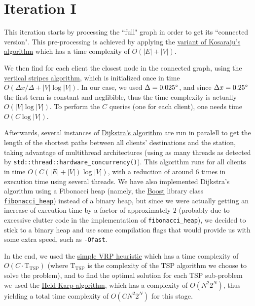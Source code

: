 \section{Iteration I} \label{iterations-1}
This iteration starts by processing the ``full" graph in order to get its ``connected version". This pre-processing is achieved by applying the \hyperref[algorithm-scc-kosaraju-v]{variant of Kosaraju's algorithm} which has a time complexity of $O(|E| + |V|)$.\par
We then find for each client the closest node in the connected graph, using the \hyperref[algorithm-vstripes]{vertical stripes algorithm}, which is initialized once in time $O(\Delta x / \Delta + |V| \log |V|)$. In our case, we used $\Delta = 0.025^{\circ}$, and since $\Delta x = 0.25^{\circ}$ the first term is constant and neglibible, thus the time complexity is actually $O(|V| \log |V|)$. To perform the $C$ queries (one for each client), one needs time $O(C \log |V|)$.\par
Afterwards, several instances of \hyperref[algorithm-shortestpath-dijkstra]{Dijkstra's algorithm} are run in paralell to get the length of the shortest paths between all clients' destinations and the station, taking advantage of multithread architectures (using as many threads as detected by \texttt{std::thread::hardware\_concurrency()}). This algorithm runs for all clients in time $O(C(|E|+|V|) \log |V|)$, with a reduction of around 6 times in execution time using several threads. We have also implemented Dijkstra's algorithm using a Fibonacci heap (namely, the \href{https://www.boost.org/}{Boost} library class \href{https://www.boost.org/doc/libs/1_49_0/doc/html/boost/heap/fibonacci_heap.html}{\texttt{fibonacci\_heap}}) instead of a binary heap, but since we were actually getting an increase of execution time by a factor of approximately $2$ (probably due to excessive clutter code in the implementation of \texttt{fibonacci\_heap}), we decided to stick to a binary heap and use some compilation flags that would provide us with some extra speed, such as \texttt{-Ofast}.
\par
In the end, we used the \hyperref[algorithm-vrp-heuristic]{simple \acrshort*{VRP} heuristic} which has a time complexity of $O(C \cdot \text{T}_\text{TSP})$ (where $\text{T}_\text{TSP}$ is the complexity of the \acrshort{TSP} algorithm we choose to solve the problem), and to find the optimal solution for each \acrshort{TSP} sub-problem we used the \hyperref[algorithm-tsp-heldkarp]{Held-Karp algorithm}, which has a complexity of $O(N^2 2^N)$, thus yielding a total time complexity of $O(C N^2 2^N)$ for this stage.\par

